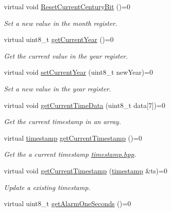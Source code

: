 \begin{DoxyCompactItemize}
virtual void \mbox{\hyperlink{classreal_time_clock_a7e306358a315d54f4fa02ef0f792573b}{Reset\+Current\+Century\+Bit}} ()=0
\begin{DoxyCompactList}\small\item\em Set a new value in the month register. \end{DoxyCompactList}\item 
virtual uint8\+\_\+t \mbox{\hyperlink{classreal_time_clock_a0cb99c34e2d6a089a62c8bea760c5add}{get\+Current\+Year}} ()=0
\begin{DoxyCompactList}\small\item\em Get the current value in the year register. \end{DoxyCompactList}\item 
virtual void \mbox{\hyperlink{classreal_time_clock_a4d6e8056f52cea52bab5c635c0860c12}{set\+Current\+Year}} (uint8\+\_\+t new\+Year)=0
\begin{DoxyCompactList}\small\item\em Set a new value in the year register. \end{DoxyCompactList}\item 
virtual void \mbox{\hyperlink{classreal_time_clock_a2d1613b3cd572f62bc9faaea6a0f82f2}{get\+Current\+Time\+Data}} (uint8\+\_\+t data\mbox{[}7\mbox{]})=0
\begin{DoxyCompactList}\small\item\em Get the current timestamp in an array. \end{DoxyCompactList}\item 
virtual \mbox{\hyperlink{classtimestamp}{timestamp}} \mbox{\hyperlink{classreal_time_clock_a08a7854ef9cef638996a267a953c9b14}{get\+Current\+Timestamp}} ()=0
\begin{DoxyCompactList}\small\item\em Get the a current timestamp \mbox{\hyperlink{timestamp_8hpp_source}{timestamp.\+hpp}}. \end{DoxyCompactList}\item 
virtual void \mbox{\hyperlink{classreal_time_clock_aa7402c5941b089d4e86b2af20d48b7ba}{get\+Current\+Timestamp}} (\mbox{\hyperlink{classtimestamp}{timestamp}} \&ts)=0
\begin{DoxyCompactList}\small\item\em Update a existing timestamp. \end{DoxyCompactList}\item 
virtual uint8\+\_\+t \mbox{\hyperlink{classreal_time_clock_af4ff1775432a08af7e41db135d16bf65}{get\+Alarm\+One\+Seconds}} ()=0

\end{DoxyCompactItemize}

